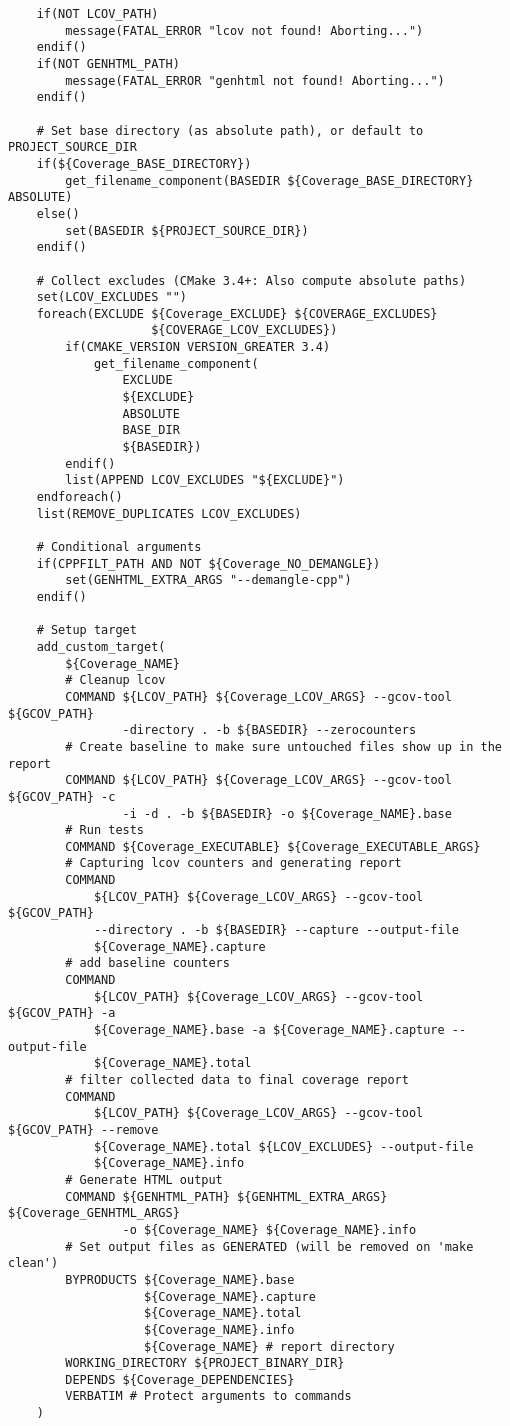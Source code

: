\documentclass[openany]{report}
\begin{document}
\begin{verbatim}
    if(NOT LCOV_PATH)
        message(FATAL_ERROR "lcov not found! Aborting...")
    endif()
    if(NOT GENHTML_PATH)
        message(FATAL_ERROR "genhtml not found! Aborting...")
    endif()

    # Set base directory (as absolute path), or default to PROJECT_SOURCE_DIR
    if(${Coverage_BASE_DIRECTORY})
        get_filename_component(BASEDIR ${Coverage_BASE_DIRECTORY} ABSOLUTE)
    else()
        set(BASEDIR ${PROJECT_SOURCE_DIR})
    endif()

    # Collect excludes (CMake 3.4+: Also compute absolute paths)
    set(LCOV_EXCLUDES "")
    foreach(EXCLUDE ${Coverage_EXCLUDE} ${COVERAGE_EXCLUDES}
                    ${COVERAGE_LCOV_EXCLUDES})
        if(CMAKE_VERSION VERSION_GREATER 3.4)
            get_filename_component(
                EXCLUDE
                ${EXCLUDE}
                ABSOLUTE
                BASE_DIR
                ${BASEDIR})
        endif()
        list(APPEND LCOV_EXCLUDES "${EXCLUDE}")
    endforeach()
    list(REMOVE_DUPLICATES LCOV_EXCLUDES)

    # Conditional arguments
    if(CPPFILT_PATH AND NOT ${Coverage_NO_DEMANGLE})
        set(GENHTML_EXTRA_ARGS "--demangle-cpp")
    endif()

    # Setup target
    add_custom_target(
        ${Coverage_NAME}
        # Cleanup lcov
        COMMAND ${LCOV_PATH} ${Coverage_LCOV_ARGS} --gcov-tool ${GCOV_PATH}
                -directory . -b ${BASEDIR} --zerocounters
        # Create baseline to make sure untouched files show up in the report
        COMMAND ${LCOV_PATH} ${Coverage_LCOV_ARGS} --gcov-tool ${GCOV_PATH} -c
                -i -d . -b ${BASEDIR} -o ${Coverage_NAME}.base
        # Run tests
        COMMAND ${Coverage_EXECUTABLE} ${Coverage_EXECUTABLE_ARGS}
        # Capturing lcov counters and generating report
        COMMAND
            ${LCOV_PATH} ${Coverage_LCOV_ARGS} --gcov-tool ${GCOV_PATH}
            --directory . -b ${BASEDIR} --capture --output-file
            ${Coverage_NAME}.capture
        # add baseline counters
        COMMAND
            ${LCOV_PATH} ${Coverage_LCOV_ARGS} --gcov-tool ${GCOV_PATH} -a
            ${Coverage_NAME}.base -a ${Coverage_NAME}.capture --output-file
            ${Coverage_NAME}.total
        # filter collected data to final coverage report
        COMMAND
            ${LCOV_PATH} ${Coverage_LCOV_ARGS} --gcov-tool ${GCOV_PATH} --remove
            ${Coverage_NAME}.total ${LCOV_EXCLUDES} --output-file
            ${Coverage_NAME}.info
        # Generate HTML output
        COMMAND ${GENHTML_PATH} ${GENHTML_EXTRA_ARGS} ${Coverage_GENHTML_ARGS}
                -o ${Coverage_NAME} ${Coverage_NAME}.info
        # Set output files as GENERATED (will be removed on 'make clean')
        BYPRODUCTS ${Coverage_NAME}.base
                   ${Coverage_NAME}.capture
                   ${Coverage_NAME}.total
                   ${Coverage_NAME}.info
                   ${Coverage_NAME} # report directory
        WORKING_DIRECTORY ${PROJECT_BINARY_DIR}
        DEPENDS ${Coverage_DEPENDENCIES}
        VERBATIM # Protect arguments to commands
    )


\end{verbatim}
\end{document}
